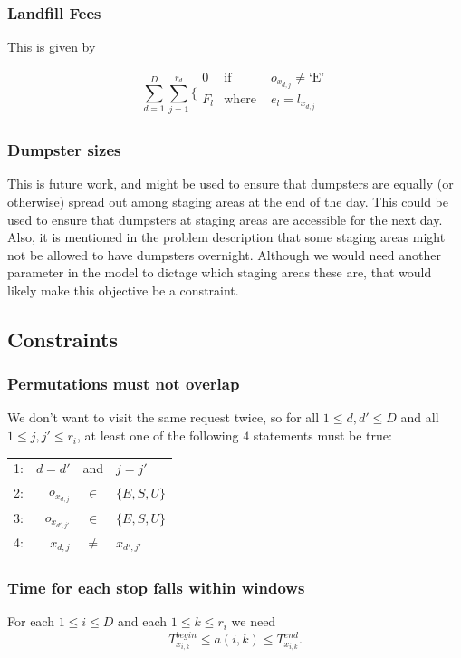 \documentclass{article}
\begin{document}
\subsubsection{Landfill Fees}
This is given by

\[
\sum_{d=1}^D \sum_{j=1}^{r_d }
\{ \begin{array}{ccc}
 0 & \mbox {if } & o_{x_{d,j}}  \ne \mbox{`E'} \\
 F_l & \mbox{where } & e_l = l_{x_{d,j}} \\
\end{array}
\]


\subsubsection{Dumpster sizes}
This is future work, and might be used to ensure that dumpsters are equally (or otherwise) spread out among staging areas at the end of the day.
This could be used to ensure that dumpsters at staging areas are accessible for the next day.
Also, it is mentioned in the problem description that some staging areas might not be allowed to have dumpsters overnight.
Although we would need another parameter in the model to dictage which staging areas these are, that would likely make this objective be a constraint.

\subsection {Constraints}

\subsubsection{Permutations must not overlap}
We don't want to visit the same request twice, so for all $1 \le d, d' \le D$ and all $1 \le j, j' \le r_i$, at least one of the following $4$ statements must be true:

\begin{tabular}{ l r  c  l }
1: & $ d=d'$ & and & $j = j'$ \\
2: & $ o_{x_{d,j}}$ & $\in$ & $\{E, S, U\}$ \\
3: & $ o_{x_{d',j'}}$ & $\in$ & $\{E, S, U\}$ \\
4: & $x_{d,j}$ & $\ne$ & $x_{d', j'}$ \\
\end{tabular}

\subsubsection{Time for each stop falls within windows}
For each $1 \le i \le D$ and each $1 \le k \le r_i$ we need
$$ T^{begin}_{x_{i,k}} \le a(i, k) \le  T^{end}_{x_{i,k}}.$$
\end{document}
